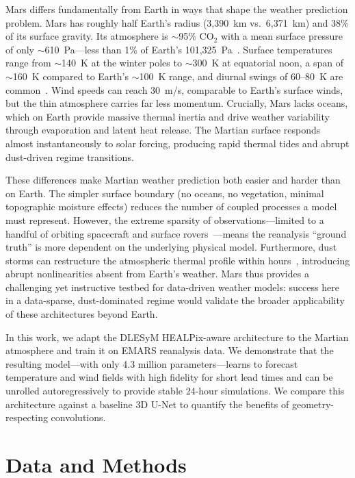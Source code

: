 \documentclass[11pt, a4paper, twocolumn]{article}
\begin{document}
Mars differs fundamentally from Earth in ways that shape the weather prediction problem. Mars has roughly half Earth's radius (3,390~km vs.\ 6,371~km) and 38\% of its surface gravity. Its atmosphere is ${\sim}$95\% CO$_2$ with a mean surface pressure of only ${\sim}$610~Pa---less than 1\% of Earth's 101,325~Pa~\cite{haberle2019}. Surface temperatures range from ${\sim}$140~K at the winter poles to ${\sim}$300~K at equatorial noon, a span of ${\sim}$160~K compared to Earth's ${\sim}$100~K range, and diurnal swings of 60--80~K are common~\cite{read2015physics}. Wind speeds can reach 30~m/s, comparable to Earth's surface winds, but the thin atmosphere carries far less momentum. Crucially, Mars lacks oceans, which on Earth provide massive thermal inertia and drive weather variability through evaporation and latent heat release. The Martian surface responds almost instantaneously to solar forcing, producing rapid thermal tides and abrupt dust-driven regime transitions.

These differences make Martian weather prediction both easier and harder than on Earth. The simpler surface boundary (no oceans, no vegetation, minimal topographic moisture effects) reduces the number of coupled processes a model must represent. However, the extreme sparsity of observations---limited to a handful of orbiting spacecraft and surface rovers~\cite{read2015physics}---means the reanalysis ``ground truth'' is more dependent on the underlying physical model. Furthermore, dust storms can restructure the atmospheric thermal profile within hours~\cite{montabone2015eight}, introducing abrupt nonlinearities absent from Earth's weather. Mars thus provides a challenging yet instructive testbed for data-driven weather models: success here in a data-sparse, dust-dominated regime would validate the broader applicability of these architectures beyond Earth.

In this work, we adapt the DLESyM HEALPix-aware architecture to the Martian atmosphere and train it on EMARS reanalysis data. We demonstrate that the resulting model---with only 4.3 million parameters---learns to forecast temperature and wind fields with high fidelity for short lead times and can be unrolled autoregressively to provide stable 24-hour simulations. We compare this architecture against a baseline 3D U-Net to quantify the benefits of geometry-respecting convolutions.

\section{Data and Methods}
\end{document}
